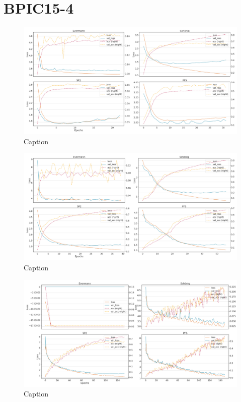 \section{BPIC15-4}
\begin{figure}[!htb]
    \centering
    \includegraphics[width=\textwidth]{gfx/bpic2015_4/individual_loss_acc_curve.png}
    \caption{Caption}
    \label{fig:my_label}
\end{figure}
\begin{figure}[!htb]
    \centering
    \includegraphics[width=\textwidth]{gfx/bpic2015_4/grouped_loss_acc_curve.png}
    \caption{Caption}
    \label{fig:my_label}
\end{figure}
\begin{figure}[!htb]
    \centering
    \includegraphics[width=\textwidth]{gfx/bpic2015_4/padded_loss_acc_curve.png}
    \caption{Caption}
    \label{fig:my_label}
\end{figure}
